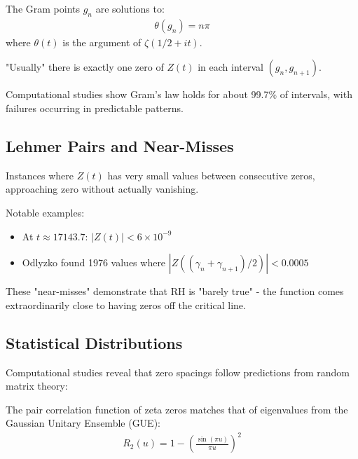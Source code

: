 \begin{definition}
The Gram points $g_n$ are solutions to:
\begin{align}
\theta(g_n) = n\pi
\end{align}
where $\theta(t)$ is the argument of $\zeta(1/2 + it)$.
\end{definition}

\begin{theorem}
"Usually" there is exactly one zero of $Z(t)$ in each interval $(g_n, g_{n+1})$.
\end{theorem}

Computational studies show Gram's law holds for about 99.7\% of intervals, with failures occurring in predictable patterns.

\subsection{Lehmer Pairs and Near-Misses}

\begin{definition}
Instances where $Z(t)$ has very small values between consecutive zeros, approaching zero without actually vanishing.
\end{definition}

Notable examples:
\begin{itemize}
\item At $t \approx 17143.7$: $|Z(t)| < 6 \times 10^{-9}$
\item Odlyzko \cite{odlyzko1985} found 1976 values where $|Z((\gamma_n + \gamma_{n+1})/2)| < 0.0005$
\end{itemize}

\begin{remark}
These "near-misses" demonstrate that RH is "barely true" - the function comes extraordinarily close to having zeros off the critical line.
\end{remark}

\subsection{Statistical Distributions}

Computational studies reveal that zero spacings follow predictions from random matrix theory:

\begin{theorem}
The pair correlation function of zeta zeros matches that of eigenvalues from the Gaussian Unitary Ensemble (GUE):
\begin{align}
R_2(u) = 1 - \left(\frac{\sin(\pi u)}{\pi u}\right)^2
\end{align}
\end{theorem}

